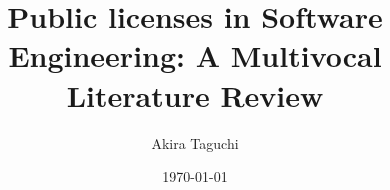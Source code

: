\documentclass[english,twoside,censored,csm,software-track-2020]{HYthesisML}
\title{Public licenses in Software Engineering: A Multivocal Literature Review}
\author{Akira Taguchi}
\date{\today}
\begin{document}
\maketitle




\mytableofcontents

\mainmatter








{}  %
\printbibliography

\backmatter
\begin{appendices}






\end{appendices}
\end{document}
